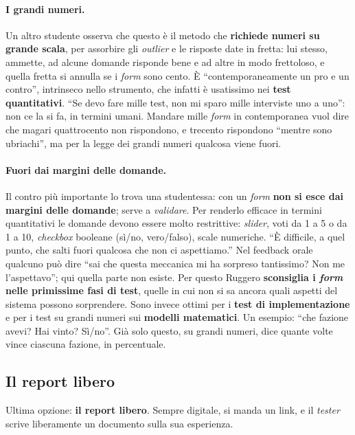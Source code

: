 \paragraph{I grandi numeri.} Un altro studente osserva che questo è il metodo che
\textbf{richiede numeri su grande scala}, per assorbire gli \emph{outlier} e le risposte
date in fretta: lui stesso, ammette, ad alcune domande risponde bene e ad altre in modo
frettoloso, e quella fretta si annulla se i \emph{form} sono cento. È ``contemporaneamente
un pro e un contro'', intrinseco nello strumento, che infatti è usatissimo nei
\textbf{test quantitativi}. ``Se devo fare mille test, non mi sparo mille interviste uno a
uno'': non ce la si fa, in termini umani. Mandare mille \emph{form} in contemporanea vuol
dire che magari quattrocento non rispondono, e trecento rispondono ``mentre sono
ubriachi'', ma per la legge dei grandi numeri qualcosa viene fuori.

\paragraph{Fuori dai margini delle domande.} Il contro più importante lo trova una
studentessa: con un \emph{form} \textbf{non si esce dai margini delle domande}; serve a
\emph{validare}. Per renderlo efficace in termini quantitativi le domande devono essere
molto restrittive: \emph{slider}, voti da 1 a 5 o da 1 a 10, \emph{checkbox} booleane
(sì/no, vero/falso), scale numeriche. ``È difficile, a quel punto, che salti fuori
qualcosa che non ci aspettiamo.'' Nel feedback orale qualcuno può dire ``sai che questa
meccanica mi ha sorpreso tantissimo? Non me l'aspettavo''; qui quella parte non esiste.
Per questo Ruggero \textbf{sconsiglia i \emph{form} nelle primissime fasi di test}, quelle
in cui non si sa ancora quali aspetti del sistema possono sorprendere. Sono invece ottimi
per i \textbf{test di implementazione} e per i test su grandi numeri sui \textbf{modelli
matematici}. Un esempio: ``che fazione avevi? Hai vinto? Sì/no''. Già solo questo, su
grandi numeri, dice quante volte vince ciascuna fazione, in percentuale.

\subsection{Il report libero}

Ultima opzione: \textbf{il report libero}. Sempre digitale, si manda un link, e il
\emph{tester} scrive liberamente un documento sulla sua esperienza.

